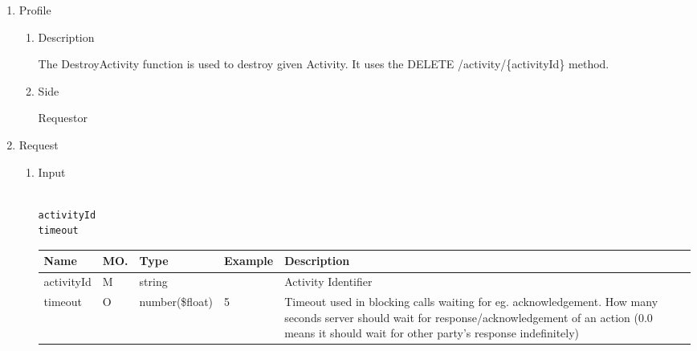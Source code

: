 \begin{enumerate}

\item Profile

\begin{enumerate}

\item Description

The DestroyActivity function is used to destroy given Activity.  
It uses the DELETE /activity/\{activityId\} method. 

\item Side

Requestor

\end{enumerate}

\item Request

\begin{enumerate}

\item Input

\begin{tcolorbox}[boxrule=0pt, frame empty]
\begin{verbatim}

activityId
timeout

\end{verbatim}
\end{tcolorbox}





\begin{table}[H]
\footnotesize

\begin{center}
\begin{tabular}{|p{3cm}|l|p{3cm}|p{3cm}|p{4cm}|} 
\hline
\rowcolor{lightgray}	Name	& MO.	& Type	& Example & 	Description \\
\hline

activityId				& M	& 	string				&								&	Activity Identifier \\ 
\hline

timeout					& O	& 	number(\$float)		&	5							&	Timeout used in blocking calls waiting for eg. acknowledgement. 
																						How many seconds server should wait for response/acknowledgement of an action 
																						(0.0 means it should wait for other party's response indefinitely) \\ 
\hline


\end{tabular}
\end{center}
\end{table}
\end{enumerate}
\end{enumerate}
